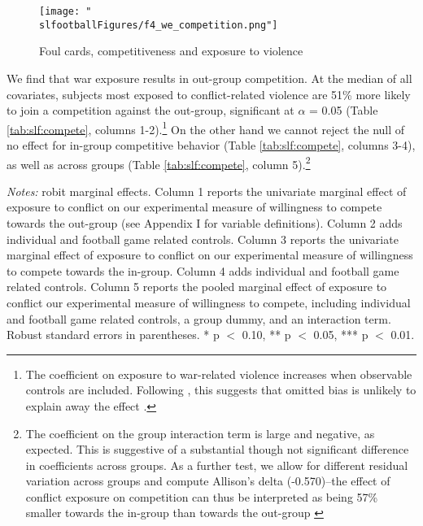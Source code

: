 \begin{figure}[htb]
  \texttt{[image: "\\slfootballFigures/f4\_we\_competition.png"]}
  \caption{Foul cards, competitiveness and exposure to violence}
  \label{fig:slf:we_competition}
\end{figure}

We find that war exposure results in out-group competition. At the median of all covariates, subjects most exposed to conflict-related violence are 51\% more likely to join a competition against the out-group, significant at $\alpha$ = 0.05 (Table \ref{tab:slf:compete}, columns 1-2).\footnote{The coefficient on exposure to war-related violence increases when observable controls are included. Following \citet{Bellows2009b}, this suggests that omitted bias is unlikely to explain away the effect \citep[see also][]{Altonji2005}.} On the other hand we cannot reject the null of no effect for in-group competitive behavior (Table \ref{tab:slf:compete}, columns 3-4), as well as across groups (Table \ref{tab:slf:compete}, column 5).\footnote{The coefficient on the group interaction term is large and negative, as expected. This is suggestive of a substantial though not significant difference in coefficients across groups. As a further test, we allow for different residual variation across groups and compute Allison’s delta (-0.570)--the effect of conflict exposure on competition can thus be interpreted as being 57\% smaller towards the in-group than towards the out-group \citep{Allison1999a}}

\begin{threeparttable}[htb]
	\caption{Willingness to Compete}
	\label{tab:slf:compete}
	\centering
	\tiny
	
	\begin{tablenotes}
		\item \textit{Notes:} robit marginal effects. Column 1 reports the univariate marginal effect of exposure to conflict on our experimental measure of willingness to compete towards the out-group (see Appendix I for variable definitions). Column 2 adds individual and football game related controls. Column 3 reports the univariate marginal effect of exposure to conflict on our experimental measure of willingness to compete towards the in-group. Column 4 adds individual and football game related controls. Column 5 reports the pooled marginal effect of exposure to conflict our experimental measure of willingness to compete, including individual and football game related controls, a group dummy, and an interaction term. Robust standard errors in parentheses. * p $<$ 0.10, ** p $<$ 0.05, *** p $<$ 0.01.
		\item
	\end{tablenotes}
\end{threeparttable}


